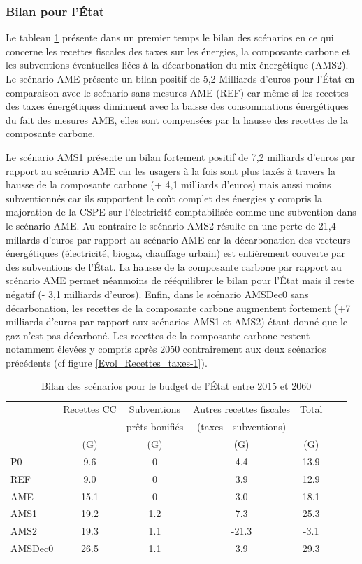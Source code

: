 \documentclass[10.5pt,a4paper]{article}
\def\euro{\mbox{\raisebox{.25ex}{{\it =}}\hspace{-.5em}{\sf C}}}
\begin{document}
{\subsubsection{Bilan pour l’État}

Le tableau \ref{Bilan_Etat} présente dans un premier temps le bilan des scénarios en ce qui concerne les recettes fiscales des taxes sur les énergies, la composante carbone et les subventions éventuelles liées à la décarbonation du mix énergétique (AMS2).  Le scénario AME présente un bilan positif de 5,2 Milliards d'euros pour l’État en comparaison avec le scénario sans mesures AME (REF) car même si les recettes des taxes énergétiques diminuent avec la baisse des consommations énergétiques du fait des mesures AME, elles sont compensées par la hausse des recettes de la composante carbone. 

Le scénario AMS1 présente un bilan fortement positif de 7,2 milliards d'euros par rapport au scénario AME car les usagers à la fois sont plus taxés à travers la hausse de la composante carbone (+ 4,1 milliards d'euros) mais aussi moins subventionnés car ils supportent le coût complet des énergies y compris la majoration de la CSPE sur l'électricité comptabilisée comme une subvention dans le scénario AME. Au contraire le scénario AMS2 résulte en une perte de 21,4 millards d'euros par rapport au scénario AME car la décarbonation des vecteurs énergétiques (électricité, biogaz, chauffage urbain) est entièrement couverte par des subventions de l’État. La hausse de la composante carbone par rapport au scénario AME permet néanmoins de rééquilibrer le bilan pour l’État mais il reste négatif (- 3,1 milliards d'euros). Enfin, dans le scénario AMSDec0 sans décarbonation, les recettes de la composante carbone augmentent fortement (+7 milliards d'euros par rapport aux scénarios AMS1 et AMS2) étant donné que le gaz n'est pas décarboné. Les recettes de la composante carbone restent notamment élevées y compris après 2050 contrairement aux deux scénarios précédents (cf figure \ref{Evol_Recettes_taxes-1}). 



\begin{table}[h] \caption{Bilan des scénarios pour le budget de l’État entre 2015 et 2060}\label{Bilan_Etat}
\begin{center}
\begin{tabular}[c]{|l|c|c|c|c|c|c|}
\hline
								&Recettes CC & Subventions  &Autres recettes fiscales & Total \\
								& 					 & prêts bonifiés & (taxes - subventions) & \\
								&		(G\euro) &			(G\euro) 	& (G\euro) 					& (G\euro)	 \\			
\hline
P0 	&9.6 & 0 &4.4 &13.9 \\
REF & 9.0 & 0 &3.9 &12.9 \\
AME &15.1 & 0&3.0 &18.1 \\
AMS1 &19.2 &1.2 &7.3 &25.3 \\
AMS2 &19.3 & 1.1&-21.3 &-3.1 \\
AMSDec0 &26.5 & 1.1 &3.9 &29.3 \\
\hline
\end{tabular}
\end{center}


\end{table}}
\end{document}
